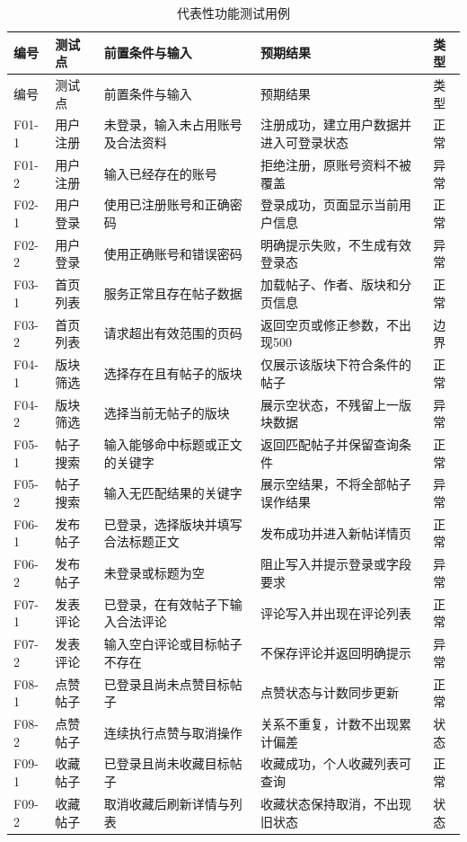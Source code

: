 \documentclass[bwprint]{report}
\begin{document}
\begin{longtable}{P{1.2cm}P{2.4cm}P{4.2cm}P{4.4cm}P{1.4cm}}
\caption{代表性功能测试用例}\label{tab:representative-cases}\\
\toprule
编号 & 测试点 & 前置条件与输入 & 预期结果 & 类型 \\
\midrule
\endfirsthead
\toprule
编号 & 测试点 & 前置条件与输入 & 预期结果 & 类型 \\
\midrule
\endhead
F01-1 & 用户注册 & 未登录，输入未占用账号及合法资料 & 注册成功，建立用户数据并进入可登录状态 & 正常 \\
F01-2 & 用户注册 & 输入已经存在的账号 & 拒绝注册，原账号资料不被覆盖 & 异常 \\
F02-1 & 用户登录 & 使用已注册账号和正确密码 & 登录成功，页面显示当前用户信息 & 正常 \\
F02-2 & 用户登录 & 使用正确账号和错误密码 & 明确提示失败，不生成有效登录态 & 异常 \\
F03-1 & 首页列表 & 服务正常且存在帖子数据 & 加载帖子、作者、版块和分页信息 & 正常 \\
F03-2 & 首页列表 & 请求超出有效范围的页码 & 返回空页或修正参数，不出现500 & 边界 \\
F04-1 & 版块筛选 & 选择存在且有帖子的版块 & 仅展示该版块下符合条件的帖子 & 正常 \\
F04-2 & 版块筛选 & 选择当前无帖子的版块 & 展示空状态，不残留上一版块数据 & 异常 \\
F05-1 & 帖子搜索 & 输入能够命中标题或正文的关键字 & 返回匹配帖子并保留查询条件 & 正常 \\
F05-2 & 帖子搜索 & 输入无匹配结果的关键字 & 展示空结果，不将全部帖子误作结果 & 异常 \\
F06-1 & 发布帖子 & 已登录，选择版块并填写合法标题正文 & 发布成功并进入新帖详情页 & 正常 \\
F06-2 & 发布帖子 & 未登录或标题为空 & 阻止写入并提示登录或字段要求 & 异常 \\
F07-1 & 发表评论 & 已登录，在有效帖子下输入合法评论 & 评论写入并出现在评论列表 & 正常 \\
F07-2 & 发表评论 & 输入空白评论或目标帖子不存在 & 不保存评论并返回明确提示 & 异常 \\
F08-1 & 点赞帖子 & 已登录且尚未点赞目标帖子 & 点赞状态与计数同步更新 & 正常 \\
F08-2 & 点赞帖子 & 连续执行点赞与取消操作 & 关系不重复，计数不出现累计偏差 & 状态 \\
F09-1 & 收藏帖子 & 已登录且尚未收藏目标帖子 & 收藏成功，个人收藏列表可查询 & 正常 \\
F09-2 & 收藏帖子 & 取消收藏后刷新详情与列表 & 收藏状态保持取消，不出现旧状态 & 状态 \\

\end{longtable}
\end{document}
